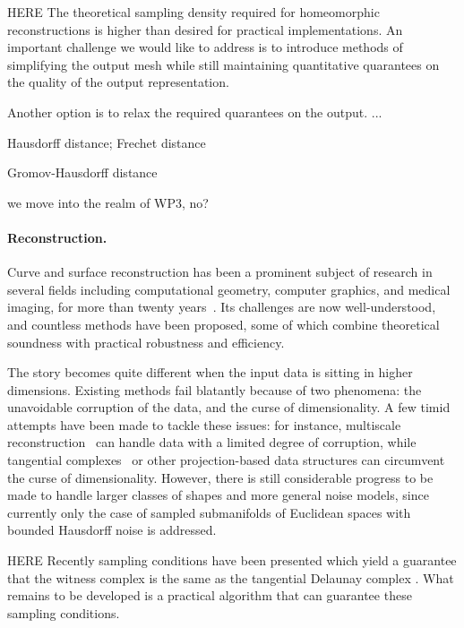 HERE
The theoretical sampling density required for homeomorphic
reconstructions is higher than desired for practical
implementations. An important challenge we would like to address is to
introduce methods of simplifying the output mesh while still
maintaining quantitative quarantees on the quality of the output
representation. 

Another option is to relax the required quarantees on the output. ...

Hausdorff distance; Frechet distance

Gromov-Hausdorff distance

we move into the realm of WP3, no?




\paragraph{Reconstruction.}

Curve and surface reconstruction has been a prominent subject of
research in several fields including computational geometry, computer
graphics, and medical imaging, for more than twenty
years~\cite{dey-csr-2007}. Its challenges are now well-understood, and
countless methods have been proposed, some of which combine
theoretical soundness with practical robustness and efficiency.

The story becomes quite different when the input data is sitting in
higher dimensions. Existing methods fail blatantly because of two
phenomena: the unavoidable corruption of the data, and the curse of
dimensionality. A few timid attempts have been made to tackle these
issues: for instance, multiscale
reconstruction~\cite{geometrica-bgo-09} can handle data with a limited
degree of corruption, while tangential
complexes~\cite{geometrica-7142i} or other projection-based data
structures can circumvent the curse of dimensionality. However, there
is still considerable progress to be made to handle larger classes of
shapes and more general noise models, since currently only the case of
sampled submanifolds of Euclidean spaces with bounded Hausdorff noise
is addressed.

HERE
Recently sampling conditions have been
presented which yield a guarantee that the witness complex is the same
as the tangential Delaunay complex
\cite{boissonnat2011cgl,boissonnat2012stab}. What remains to be
developed is a practical algorithm that can guarantee these sampling
conditions. 



